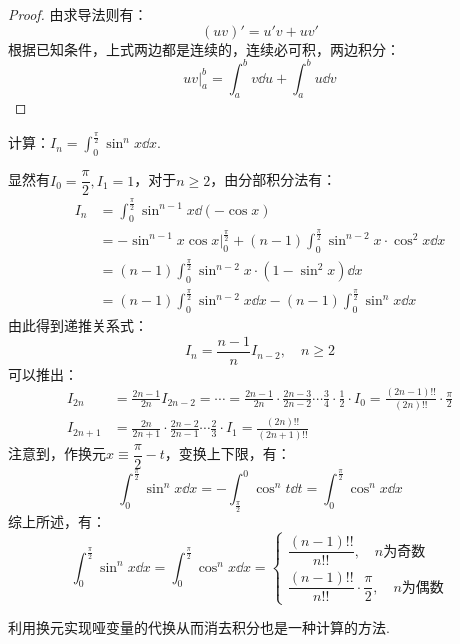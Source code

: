\begin{proof}
    由求导法则有：
    \[(uv)' = u'v + uv'\]
    根据已知条件，上式两边都是连续的，连续必可积，两边积分：
    \[uv\Big|_a^b = \int_{a}^{b}v\dd{u} + \int_{a}^{b}u\dd{v}\]
\end{proof}

\begin{question}
    计算：$\displaystyle I_n = \int_{0}^{\frac{\pi}{2}}\sin^n x \dd{x}$.
\end{question}

\begin{solution}
    显然有$I_0 = \dfrac{\pi}{2},I_1 = 1$，对于$n \geqslant 2$，由分部积分法有：
    \begin{align*}
        I_n &= \int_{0}^{\frac{\pi}{2}}\sin^{n-1} x \dd{(-\cos x)} \\
        &= -\sin^{n-1} x \cos x \Big|_0^{\frac{\pi}{2}} + (n-1)\int_{0}^{\frac{\pi}{2}}\sin^{n-2}x \cdot \cos^2 x \dd{x}\\
        &= (n-1)\int_{0}^{\frac{\pi}{2}}\sin^{n-2}x\cdot (1-\sin^2 x)\dd{x}\\
        &= (n-1)\int_{0}^{\frac{\pi}{2}}\sin^{n-2}x\dd{x} - (n-1)\int_{0}^{\frac{\pi}{2}}\sin^n x\dd{x}
    \end{align*}
    由此得到递推关系式：
    \[I_n = \frac{n-1}{n}I_{n-2},\quad n\geqslant 2\]
    可以推出：
    \begin{align*}
        I_{2n} &= \frac{2n-1}{2n}I_{2n-2} = \cdots = \frac{2n-1}{2n}\cdot\frac{2n-3}{2n-2}\cdots\frac{3}{4}\cdot\frac{1}{2}\cdot I_0 = \frac{(2n-1)!!}{(2n)!!}\cdot\frac{\pi}{2}\\
        I_{2n+1} &= \frac{2n}{2n+1}\cdot\frac{2n-2}{2n-1}\cdots\frac{2}{3}\cdot I_1 = \frac{(2n)!!}{(2n+1)!!}
    \end{align*}
    注意到，作换元$x \equiv \dfrac{\pi}{2} - t$，变换上下限，有：
    \[\int_{0}^{\frac{\pi}{2}}\sin^n x\dd{x} = -\int_{\frac{\pi}{2}}^{0}\cos^n t\dd{t} = \int_{0}^{\frac{\pi}{2}}\cos^n x\dd{x}\]
    综上所述，有：
    \[\int_{0}^{\frac{\pi}{2}}\sin^n x\dd{x} = \int_{0}^{\frac{\pi}{2}}\cos^n x\dd{x} = \begin{cases}
        \dfrac{(n-1)!!}{n!!},\quad\text{$n$为奇数}\\[0.5em]
        \dfrac{(n-1)!!}{n!!}\cdot\dfrac{\pi}{2},\quad\text{$n$为偶数}
    \end{cases}\]
\end{solution}

利用换元实现哑变量的代换从而消去积分也是一种计算的方法.

